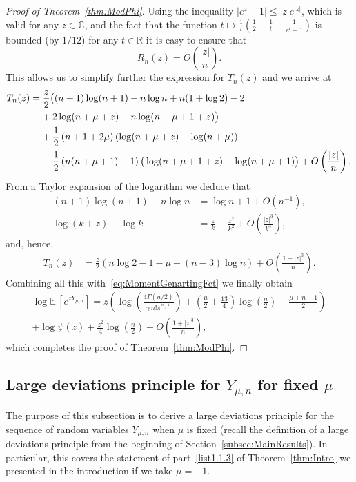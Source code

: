 \documentclass[10pt]{amsart}
\theoremstyle{definition}\newtheorem{defi}[theo]{Definition}\newtheorem{rema}[theo]{Remark}\newtheorem{exam}[theo]{Example}\newtheorem{exem}[theo]{Example}\newtheorem{nota}[theo]{Notation}
\newcommand{\R}{\mathbb{R}}
\newcommand{\EE}{\mathbb{E}\,}
\begin{document}
\begin{proof}[Proof of Theorem~\ref{thm:ModPhi}]
\goodbreak
Using the inequality $|e^z-1|\leq |z|e^{|z|}$, which is valid for any $z\in \mathbb{C}$, and the fact that the function $t\mapsto \frac{1}{t}(\frac{1}{2}-\frac{1}{t}+\frac{1}{e^t-1})$ is bounded (by $1/12$) for any $t\in\R$ it is easy to ensure that
\[
R_n(z)=O\left(\frac{|z|}{n}\right).
\]
This allows us to simplify further the expression for $T_n(z)$ and we arrive at
\begin{align*}
T_n(z)&=\frac{z}{2}\big((n+1)\log(n+1)-n\log n+n(1+\log 2)-2\\
&\mkern20mu +2\log(n+\mu+z)-n\log (n+\mu+1+z)\big)\\
&\mkern20mu +\frac{1}{2}\left(n+1+2\mu\right)(\log(n+\mu+z)-\log(n+\mu))\\
&\mkern20mu -\frac{1}{2}\left(n(n+\mu+1)-1\right)\big(\log(n+\mu+1+z)-\log(n+\mu+1)\big)+O\left(\frac{|z|}{n}\right).
\end{align*}
From a Taylor expansion of the logarithm we deduce that
\begin{align*}
(n+1)\log(n+1)-n\log n&=\log n+1+O\left(n^{-1}\right),\\
\log(k+z)-\log k&=\frac{z}{k}-\frac{z^2}{k^2}+O\left(\frac{|z|^3}{k^3}\right),
\end{align*}
and, hence,
\begin{align*}
T_n(z)&=\frac{z}{2}\left(n\log 2-1-\mu-(n-3)\log n\right)+O\left(\frac{1+|z|^3}{n}\right).
\end{align*}
Combining all this with~\eqref{eq:MomentGenartingFct} we finally obtain
\begin{multline}\label{eq:AsympMomentGenFct}
\log \EE \left[e^{zY_{\mu,n}}\right] =z\left(\log\left(\frac{4\Gamma(n/2)}{\gamma\,n!\pi^{\frac{n-1}{2}}}\right)+\left(\frac{\mu}{2}+\frac{13}{4}\right)\log\left(\frac{n}{2}\right)-\frac{\mu+n+1}{2}\right)\\
+\log \psi(z)+\frac{z^2}{4}\log \left(\frac{n}{2}\right)+O\left(\frac{1+|z|^3}{n}\right),
\end{multline}
which completes the proof of Theorem~\ref{thm:ModPhi}.
\end{proof}

\subsection{Large deviations principle for \texorpdfstring{$Y_{\mu,n}$}{Y mu,n} for fixed \texorpdfstring{$\mu$}{mu}}

The purpose of this subsection is to derive a large deviations principle for the sequence of random variables $Y_{\mu,n}$ when $\mu$ is fixed (recall the definition of a large deviations principle from the beginning of Section~\ref{subsec:MainResults}). In particular, this covers the statement of part~\eqref{list1.1.3} of Theorem~\ref{thm:Intro} we presented in the introduction if we take $\mu=-1$.
\end{document}
